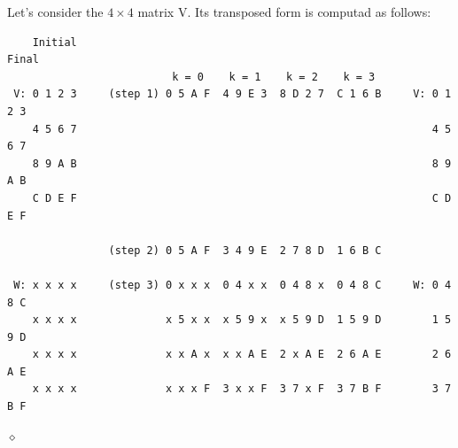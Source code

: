\begin{exemplu}
Let's consider the $4 \times 4$ matrix V. Its transposed form is computad as follows:

{\small
\begin{verbatim}
    Initial                                                        Final
                          k = 0    k = 1    k = 2    k = 3
 V: 0 1 2 3     (step 1) 0 5 A F  4 9 E 3  8 D 2 7  C 1 6 B     V: 0 1 2 3
    4 5 6 7                                                        4 5 6 7
    8 9 A B                                                        8 9 A B
    C D E F                                                        C D E F

                (step 2) 0 5 A F  3 4 9 E  2 7 8 D  1 6 B C

 W: x x x x     (step 3) 0 x x x  0 4 x x  0 4 8 x  0 4 8 C     W: 0 4 8 C
    x x x x              x 5 x x  x 5 9 x  x 5 9 D  1 5 9 D        1 5 9 D
    x x x x              x x A x  x x A E  2 x A E  2 6 A E        2 6 A E
    x x x x              x x x F  3 x x F  3 7 x F  3 7 B F        3 7 B F
\end{verbatim}
 }

$\diamond$
\end{exemplu}




